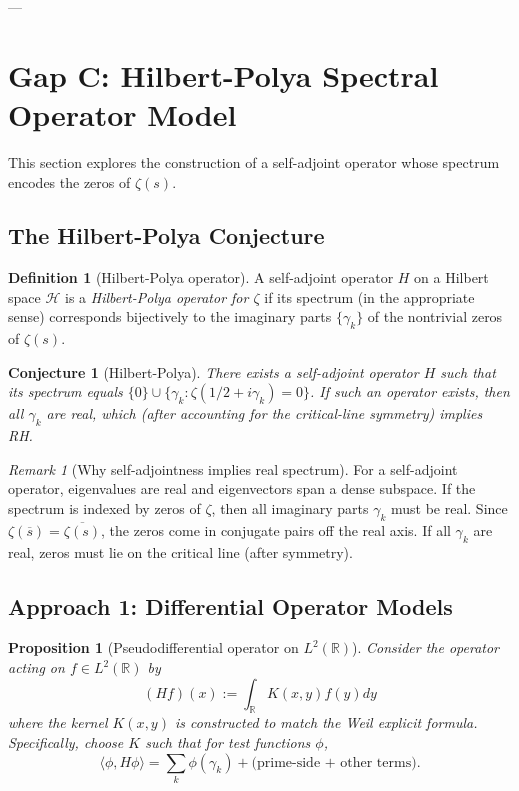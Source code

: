 \documentclass[11pt]{article}
\theoremstyle{plain}
\newtheorem{proposition}[theorem]{Proposition}
\newtheorem{conjecture}[theorem]{Conjecture}
\theoremstyle{definition}
\newtheorem{definition}[theorem]{Definition}
\theoremstyle{remark}
\newtheorem{remark}[theorem]{Remark}
\begin{document}
---

\section{Gap C: Hilbert-Polya Spectral Operator Model}

This section explores the construction of a self-adjoint operator whose spectrum encodes the zeros of $\zeta(s)$.

\subsection{The Hilbert-Polya Conjecture}

\begin{definition}[Hilbert-Polya operator]
A self-adjoint operator $H$ on a Hilbert space $\mathcal{H}$ is a \emph{Hilbert-Polya operator for $\zeta$} if
its spectrum (in the appropriate sense) corresponds bijectively to the imaginary parts $\{\gamma_k\}$ of the
nontrivial zeros of $\zeta(s)$.
\end{definition}

\begin{conjecture}[Hilbert-Polya]
There exists a self-adjoint operator $H$ such that its spectrum equals $\{0\} \cup \{\gamma_k : \zeta(1/2+i\gamma_k)=0\}$.
If such an operator exists, then all $\gamma_k$ are real, which (after accounting for the critical-line symmetry) implies RH.
\end{conjecture}

\begin{remark}[Why self-adjointness implies real spectrum]
For a self-adjoint operator, eigenvalues are real and eigenvectors span a dense subspace.
If the spectrum is indexed by zeros of $\zeta$, then all imaginary parts $\gamma_k$ must be real.
Since $\zeta(\overline{s}) = \overline{\zeta(s)}$, the zeros come in conjugate pairs off the real axis.
If all $\gamma_k$ are real, zeros must lie on the critical line (after symmetry).
\end{remark}

\subsection{Approach 1: Differential Operator Models}

\begin{proposition}[Pseudodifferential operator on $L^2(\mathbb{R})$]
Consider the operator acting on $f\in L^2(\mathbb{R})$ by
\[
(Hf)(x) := \int_{\mathbb{R}} K(x,y) f(y) dy
\]
where the kernel $K(x,y)$ is constructed to match the Weil explicit formula.
Specifically, choose $K$ such that for test functions $\phi$,
\[
\langle \phi, H\phi \rangle = \sum_k \phi(\gamma_k) + \text{(prime-side + other terms)}.
\]
\end{proposition}
\end{document}
